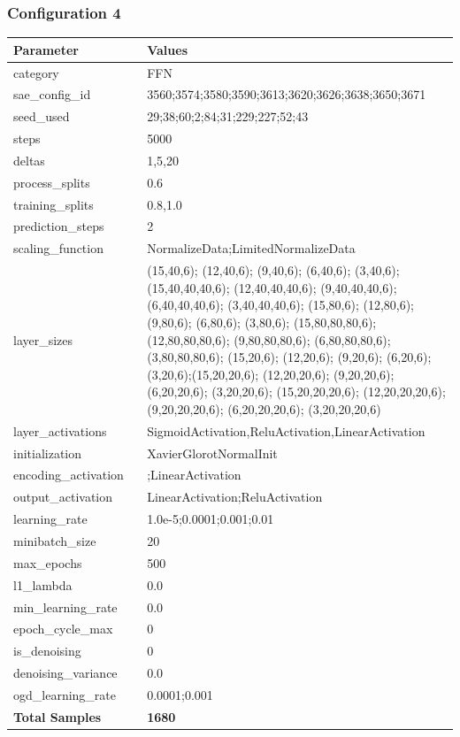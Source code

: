\documentclass[a4paper,11pt,oneside]{article}
\theoremstyle{plain}
\theoremstyle{definition}
\begin{document}
	\newpage
	\subsubsection{Configuration 4}\label{config4}
	\begin{longtable}[H]{|p{0.3\linewidth}|p{0.7\linewidth}|} \hline \textbf{Parameter} &\textbf{Values} \\\hline{category} & {FFN} \\\hline
		{sae\_config\_id} & {3560;3574;3580;3590;3613;3620;3626;3638;3650;3671} \\\hline
		{seed\_used} & {29;38;60;2;84;31;229;227;52;43} \\\hline
		{steps} & {5000} \\\hline
		{deltas} & {1,5,20} \\\hline
		{process\_splits} & {0.6} \\\hline
		{training\_splits} & {0.8,1.0} \\\hline
		{prediction\_steps} & {2} \\\hline
		{scaling\_function} & {NormalizeData;LimitedNormalizeData} \\\hline
		{layer\_sizes} & {(15,40,6); (12,40,6); (9,40,6); (6,40,6); (3,40,6); (15,40,40,40,6); (12,40,40,40,6); (9,40,40,40,6); (6,40,40,40,6); (3,40,40,40,6); (15,80,6); (12,80,6); (9,80,6); (6,80,6); (3,80,6); (15,80,80,80,6); (12,80,80,80,6); (9,80,80,80,6); (6,80,80,80,6); (3,80,80,80,6); (15,20,6); (12,20,6); (9,20,6); (6,20,6); (3,20,6);(15,20,20,6); (12,20,20,6); (9,20,20,6); (6,20,20,6); (3,20,20,6); (15,20,20,20,6); (12,20,20,20,6); (9,20,20,20,6); (6,20,20,20,6); (3,20,20,20,6)} \\\hline
		{layer\_activations} & {SigmoidActivation,ReluActivation,LinearActivation} \\\hline
		{initialization} & {XavierGlorotNormalInit} \\\hline
		{encoding\_activation} & {;LinearActivation} \\\hline
		{output\_activation} & {LinearActivation;ReluActivation} \\\hline
		{learning\_rate} & {1.0e-5;0.0001;0.001;0.01} \\\hline
		{minibatch\_size} & {20} \\\hline
		{max\_epochs} & {500} \\\hline
		{l1\_lambda} & {0.0} \\\hline
		{min\_learning\_rate} & {0.0} \\\hline
		{epoch\_cycle\_max} & {0} \\\hline
		{is\_denoising} & {0} \\\hline
		{denoising\_variance} & {0.0} \\\hline
		{ogd\_learning\_rate} & {0.0001;0.001} \\\hline
		{\textbf{Total Samples}} & {\textbf{1680}} \\\hline
	\end{longtable}
	
\end{document}
